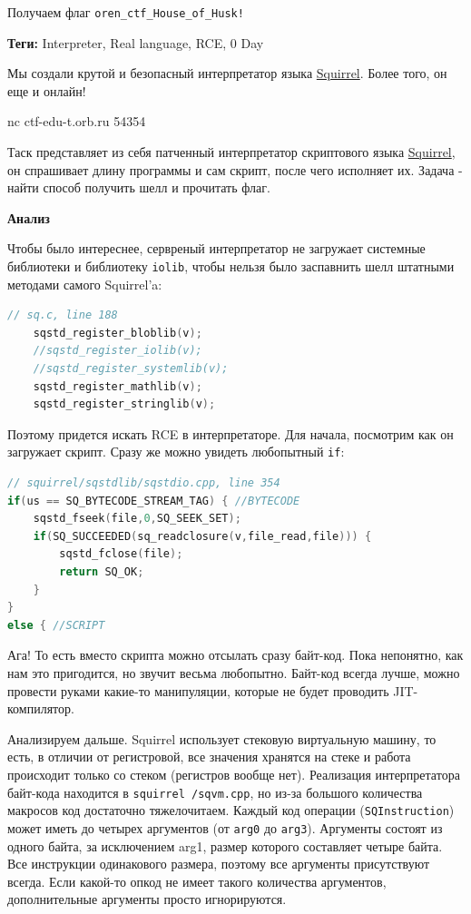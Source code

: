 \documentclass[idxtotoc,hyperref,openany,oneside]{files/pwn} %
\begin{document}
Получаем флаг \verb|oren_ctf_House_of_Husk!|




\textbf{Теги:} Interpreter, Real language, RCE, 0 Day\vspace{\baselineskip}

\begin{tcolorbox}
Мы создали крутой и безопасный интерпретатор языка \href{http://squirrel-lang.org/}{Squirrel}. Более того, он еще и онлайн!

nc ctf-edu-t.orb.ru 54354
\end{tcolorbox}

Таск представляет из себя патченный интерпретатор скриптового языка \href{http://squirrel-lang.org/}{Squirrel}, он спрашивает длину программы и сам скрипт, после чего исполняет их. Задача - найти способ получить шелл и прочитать флаг.

\textbf{Анализ}

Чтобы было интереснее, сервреный интерпретатор не загружает системные библиотеки и библиотеку \verb|iolib|, чтобы нельзя было заспавнить шелл штатными методами самого Squirrel'a:
\begin{lstlisting}[language=C]
// sq.c, line 188
	sqstd_register_bloblib(v);
	//sqstd_register_iolib(v);
	//sqstd_register_systemlib(v);
	sqstd_register_mathlib(v);
	sqstd_register_stringlib(v);
\end{lstlisting}

Поэтому придется искать RCE в интерпретаторе. Для начала, посмотрим как он загружает скрипт. Сразу же можно увидеть любопытный \verb|if|:
\begin{lstlisting}[language=C]
// squirrel/sqstdlib/sqstdio.cpp, line 354
if(us == SQ_BYTECODE_STREAM_TAG) { //BYTECODE
    sqstd_fseek(file,0,SQ_SEEK_SET);
    if(SQ_SUCCEEDED(sq_readclosure(v,file_read,file))) {
        sqstd_fclose(file);
        return SQ_OK;
    }
}
else { //SCRIPT
\end{lstlisting}

Ага! То есть вместо скрипта можно отсылать сразу байт-код. Пока непонятно, как нам это пригодится, но звучит весьма любопытно. Байт-код всегда лучше, можно провести руками какие-то манипуляции, которые не будет проводить JIT-компилятор. 

Анализируем дальше. Squirrel использует стековую виртуальную машину, то есть, в отличии от регистровой, все значения хранятся на стеке и работа происходит только со стеком (регистров вообще нет). Реализация интерпретатора байт-кода находится в \verb|squirrel /sqvm.cpp|, но из-за большого количества макросов код достаточно тяжелочитаем. Каждый код операции (\verb|SQInstruction|) может иметь до четырех аргументов (от \verb|arg0| до \verb|arg3|). Аргументы состоят из одного байта, за исключением arg1, размер которого составляет четыре байта. Все инструкции одинакового размера, поэтому все аргументы присутствуют всегда. Если какой-то опкод не имеет такого количества аргументов, дополнительные аргументы просто игнорируются. 
\end{document}
